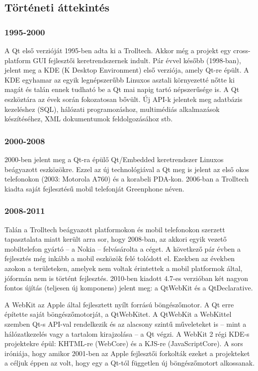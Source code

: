 \documentclass[12pt]{report}
\begin{document}
\subsection{Történeti áttekintés}
\subsubsection{1995-2000}
A Qt első verzióját 1995-ben adta ki a Trolltech. Akkor még a projekt egy cross-platform GUI
fejlesztői keretrendszernek indult. Pár évvel később (1998-ban), jelent meg a
KDE (K Desktop Environment) első verziója, amely Qt-re épült. A KDE egyhamar az egyik
legnépszerűbb Linuxos asztali környezetté nőtte ki magát és talán ennek tudható be a Qt
mai napig tartó népszerűsége is. A Qt eszköztára az évek során fokozatosan bővült.
Új API-k jelentek meg adatbázis kezeléshez (SQL), hálózati programozáshoz, multimédiás
alkalmazások készítéséhez, XML dokumentumok feldolgozásához stb.

\subsubsection{2000-2008}
2000-ben jelent meg a Qt-ra épülő Qt/Embedded keretrendszer Linuxos beágyazott eszközökre.
Ezzel az új technológiával a Qt meg is jelent az első okos telefonokon (2003: Motorola A760)
és a korabeli PDA-kon. 2006-ban a Trolltech kiadta saját fejlesztésű mobil telefonját
Greenphone néven.

\subsubsection{2008-2011}
Talán a Trolltech beágyazott platformokon és mobil telefonokon szerzett tapasztalata
miatt került arra sor, hogy 2008-ban, az akkori egyik vezető mobiltelefon gyártó -- a Nokia --
felvásárolta a céget. A következő pár évben a fejlesztés még inkább a mobil eszközök
felé tolódott el. Ezekben az években azokon a területeken, amelyek nem voltak érintettek a
mobil platformok által, jóformán nem is történt fejlesztés.
2010-ben kiadott 4.7-es verzióban két nagyon fontos újítás (teljesen új komponens) jelent meg:
a QtWebKit és a QtDeclarative.

A WebKit az Apple által fejlesztett nyílt forrású böngészőmotor. A Qt erre építette saját
böngészőmotorját, a QtWebKitet. A QtWebKit a WebKittel szemben Qt-s API-val rendelkezik és az
alacsony szintű műveleteket is -- mint a hálózatkezelés vagy a tartalom kirajzolása -- a Qt
végzi. A WebKit 2 régi KDE-s projektekre épül: KHTML-re (WebCore) és a
KJS-re (JavaScriptCore). A sors iróniája, hogy amikor 2001-ben az Apple fejlesztői forkolták
ezeket a projekteket a céljuk éppen az volt, hogy egy a Qt-tól független új böngészőmotort
alkossanak.
\end{document}
